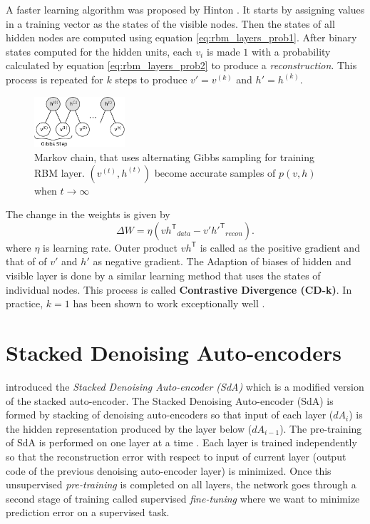 A faster learning algorithm was proposed by Hinton \cite{hinton2002training,hinton2006reducing,hinton2010practical}. It starts by assigning values in a training vector as the states of the visible nodes. Then the states of all hidden nodes are computed using equation \ref{eq:rbm_layers_prob1}. After binary states computed for the hidden units, each $v_i$ is made $1$ with a probability calculated by equation \ref{eq:rbm_layers_prob2} to produce a \textit{reconstruction}. This process is repeated for $k$ steps to produce $v'= v^{(k)}$ and $h' = h^{(k)}$. 

\begin{figure}[ht]
\centering
\includegraphics[width=0.3\textwidth]{./imgs/markov_chain.png}
\caption[Markov chain of training RBM layer]{Markov chain, that uses alternating Gibbs sampling for training RBM layer. $(v^{(t)}, h^{(t)})$ become accurate samples of $p(v,h)$ when $t \rightarrow \infty$}
\label{fig:rbmmarkovChain}
\end{figure}

The change in the weights is given by
$$ \Delta W = \eta ({vh^\mathsf{T}}_{data} - {v'h'^{\mathsf{T}}}_{recon}). $$
where $\eta$ is learning rate. Outer product $vh^\mathsf{T}$ is called as the positive gradient and that of of $v'$ and $h'$ as negative gradient. The Adaption of biases of hidden and visible layer is done by a similar learning method that uses the states of individual nodes. This process is called \textbf{Contrastive Divergence (CD-k)}. In practice, $k=1$ has been shown to work exceptionally well \cite{hinton2010practical}.

\section{Stacked Denoising Auto-encoders}
\citet{vincent2010stacked} introduced the \emph{Stacked Denoising Auto-encoder (SdA)} which is a modified version of the stacked auto-encoder. The Stacked Denoising Auto-encoder (SdA) is formed by stacking of denoising auto-encoders so that input of each layer ($dA_i$) is the hidden representation produced by the layer below ($dA_{i-1}$). The pre-training of SdA is performed on one layer at a time . Each layer is trained independently so that the reconstruction error with respect to input of current layer (output code of the previous denoising auto-encoder layer) is minimized. Once this unsupervised \textit{pre-training} is completed on all layers, the network goes through a second stage of training called supervised \textit{fine-tuning} where we want to minimize prediction error on a supervised task.

